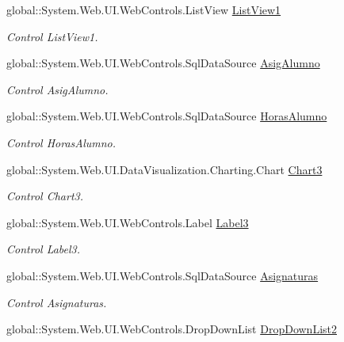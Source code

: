 \begin{DoxyCompactItemize}
global\+::\+System.\+Web.\+U\+I.\+Web\+Controls.\+List\+View \mbox{\hyperlink{classInicio_1_1Profesor_1_1Estadisticas_a892cbd1efdf1a2be5a806de2a637c3bf}{List\+View1}}
\begin{DoxyCompactList}\small\item\em Control List\+View1. \end{DoxyCompactList}\item 
global\+::\+System.\+Web.\+U\+I.\+Web\+Controls.\+Sql\+Data\+Source \mbox{\hyperlink{classInicio_1_1Profesor_1_1Estadisticas_aff6da716abe4311dc3fc374b4f45434a}{Asig\+Alumno}}
\begin{DoxyCompactList}\small\item\em Control Asig\+Alumno. \end{DoxyCompactList}\item 
global\+::\+System.\+Web.\+U\+I.\+Web\+Controls.\+Sql\+Data\+Source \mbox{\hyperlink{classInicio_1_1Profesor_1_1Estadisticas_a6f9687e52da02e70a125116ade7cd0f1}{Horas\+Alumno}}
\begin{DoxyCompactList}\small\item\em Control Horas\+Alumno. \end{DoxyCompactList}\item 
global\+::\+System.\+Web.\+U\+I.\+Data\+Visualization.\+Charting.\+Chart \mbox{\hyperlink{classInicio_1_1Profesor_1_1Estadisticas_a05a18dc36b6140c184e2446d19e1a89b}{Chart3}}
\begin{DoxyCompactList}\small\item\em Control Chart3. \end{DoxyCompactList}\item 
global\+::\+System.\+Web.\+U\+I.\+Web\+Controls.\+Label \mbox{\hyperlink{classInicio_1_1Profesor_1_1Estadisticas_aabd2c832778130594f125966239333a5}{Label3}}
\begin{DoxyCompactList}\small\item\em Control Label3. \end{DoxyCompactList}\item 
global\+::\+System.\+Web.\+U\+I.\+Web\+Controls.\+Sql\+Data\+Source \mbox{\hyperlink{classInicio_1_1Profesor_1_1Estadisticas_a3717d525923c5cc602bcbdbec65c9b04}{Asignaturas}}
\begin{DoxyCompactList}\small\item\em Control Asignaturas. \end{DoxyCompactList}\item 
global\+::\+System.\+Web.\+U\+I.\+Web\+Controls.\+Drop\+Down\+List \mbox{\hyperlink{classInicio_1_1Profesor_1_1Estadisticas_a6d6788b2b0a6818271255efb0470329d}{Drop\+Down\+List2}}

\end{DoxyCompactItemize}
